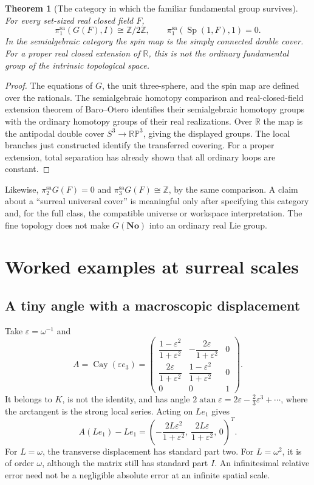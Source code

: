 \documentclass[11pt,letterpaper]{article}
\numberwithin{equation}{section}
\newtheorem{theorem}{Theorem}[section]
\theoremstyle{definition}
\theoremstyle{remark}
\newcommand{\No}{\mathbf{No}}
\newcommand{\R}{\mathbb R}
\newcommand{\Z}{\mathbb Z}
\newcommand{\eps}{\varepsilon}
\newcommand{\atan}{\operatorname{atan}}
\newcommand{\Sp}{\operatorname{Sp}}
\newcommand{\cay}{\operatorname{Cay}}
\begin{document}
\begin{theorem}[The category in which the familiar fundamental group survives]
\label{e3:so:thm:sahomotopy}
For every set-sized real closed field \(F\),
\[
 \pi_1^{\mathrm{sa}}(G(F),I)\cong\Z/2\Z,
 \qquad \pi_1^{\mathrm{sa}}(\Sp(1,F),1)=0.
\]
In the semialgebraic category the spin map is the simply connected double
cover. For a proper real closed extension of \(\R\), this is not the ordinary
fundamental group of the intrinsic topological space.
\end{theorem}
\begin{proof}
The equations of \(G\), the unit three-sphere, and the spin map are defined
over the rationals. The semialgebraic homotopy comparison and real-closed-field
extension theorem of Baro--Otero \cite[Corollaries 4.3--4.4]{BO} identifies their
semialgebraic homotopy groups with the ordinary homotopy groups of their real
realizations. Over \(\R\) the map is the antipodal double cover
\(S^3\to\mathbb{RP}^3\), giving the displayed groups. The local branches just
constructed identify the transferred covering. For a proper extension,
total separation has already shown that all ordinary loops are constant.
\end{proof}

Likewise, \(\pi_2^{\mathrm{sa}}G(F)=0\) and
\(\pi_3^{\mathrm{sa}}G(F)\cong\Z\), by the same comparison. A claim about a
``surreal universal cover'' is meaningful only after specifying this category
and, for the full class, the compatible universe or workspace interpretation.
The fine topology does not make \(G(\No)\) into an ordinary real Lie group.

\section{Worked examples at surreal scales}\label{e3:so:sec:examples}

\subsection{A tiny angle with a macroscopic displacement}

Take \(\eps=\omega^{-1}\) and
\begin{equation}\label{e3:so:eq:epsrotation}
 A=\cay(\eps e_3)=
 \begin{pmatrix}
 \dfrac{1-\eps^2}{1+\eps^2}&-\dfrac{2\eps}{1+\eps^2}&0\\[5pt]
 \dfrac{2\eps}{1+\eps^2}&\dfrac{1-\eps^2}{1+\eps^2}&0\\[5pt]
 0&0&1
 \end{pmatrix}.
\end{equation}
It belongs to \(K\), is not the identity, and has angle
\(2\atan\eps=2\eps-\tfrac23\eps^3+\cdots\), where the arctangent is the
strong local series. Acting on \(Le_1\) gives
\[
 A(Le_1)-Le_1=
 \left(-\frac{2L\eps^2}{1+\eps^2},\,
             \frac{2L\eps}{1+\eps^2},\,0\right)^T.
\]
For \(L=\omega\), the transverse displacement has standard part two. For
\(L=\omega^2\), it is of order \(\omega\), although the matrix still has
standard part \(I\). An infinitesimal relative error need not be a negligible
absolute error at an infinite spatial scale.
\end{document}
